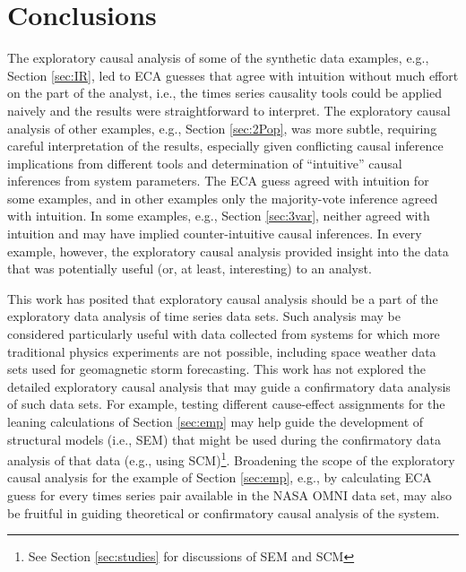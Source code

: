 \chapter{Conclusions}
The exploratory causal analysis of some of the synthetic data examples, e.g., Section \ref{sec:IR}, led to ECA guesses that agree with intuition without much effort on the part of the analyst, i.e., the times series causality tools could be applied naively and the results were straightforward to interpret.  The exploratory causal analysis of other examples, e.g., Section \ref{sec:2Pop}, was more subtle, requiring careful interpretation of the results, especially given conflicting causal inference implications from different tools and determination of ``intuitive'' causal inferences from system parameters.  The ECA guess agreed with intuition for some examples, and in other examples only the majority-vote inference agreed with intuition.  In some examples, e.g., Section \ref{sec:3var}, neither agreed with intuition and may have implied counter-intuitive causal inferences.  In every example, however, the exploratory causal analysis provided insight into the data that was potentially useful (or, at least, interesting) to an analyst.

This work has posited that exploratory causal analysis should be a part of the exploratory data analysis of time series data sets.  Such analysis may be considered particularly useful with data collected from systems for which more traditional physics experiments are not possible, including space weather data sets used for geomagnetic storm forecasting.  This work has not explored the detailed exploratory causal analysis that may guide a confirmatory data analysis of such data sets.  For example, testing different cause-effect assignments for the leaning calculations of Section \ref{sec:emp} may help guide the development of structural models (i.e., SEM) that might be used during the confirmatory data analysis of that data (e.g., using SCM)\footnote{See Section \ref{sec:studies} for discussions of SEM and SCM}.  Broadening the scope of the exploratory causal analysis for the example of Section \ref{sec:emp}, e.g., by calculating ECA guess for every times series pair available in the NASA OMNI data set, may also be fruitful in guiding theoretical or confirmatory causal analysis of the system.


